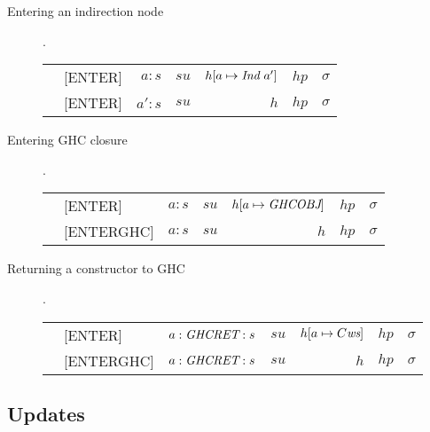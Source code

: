 \documentclass[11pt]{article}
\newcommand{\Subsection}[2]{\subsection{#1}\label{sec:#2}}
\begin{document}
\begin{description}
\item[ Entering an indirection node ].

\begin{tabular}{|llrrrrr|}
\hline
	& [ENTER]	& $a  : s$ 	& $su$ & $h[a \mapsto {\mbox{\it Ind}\ {a'}}]$ 	& $hp$ & $\sigma$ \\
\next	& [ENTER]	& $a' : s$ 	& $su$ & $h$ 				& $hp$ & $\sigma$ \\
\hline
\end{tabular}

\item[Entering GHC closure].

\begin{tabular}{|llrrrrr|}
\hline
	& [ENTER]	& $a : s$ 	& $su$ & $h[a \mapsto \mbox{\it GHCOBJ}]$  	& $hp$ & $\sigma$ \\
\next	& [ENTERGHC] 	& $a : s$ 	& $su$ & $h$ 				& $hp$ & $\sigma$ \\
\hline
\end{tabular}

\item[Returning a constructor to GHC].

\begin{tabular}{|llrrrrr|}
\hline
	& [ENTER]	& $a : \mbox{\it GHCRET} : s$ 	& $su$ & $h[a \mapsto C \mbox{\it ws}]$  	& $hp$ & $\sigma$ \\
\next	& [ENTERGHC]	& $a : \mbox{\it GHCRET} : s$ 	& $su$ & $h$ 			& $hp$ & $\sigma$ \\
\hline
\end{tabular}

\end{description}


\Subsection{Updates}{hugs-updates}
\end{document}
